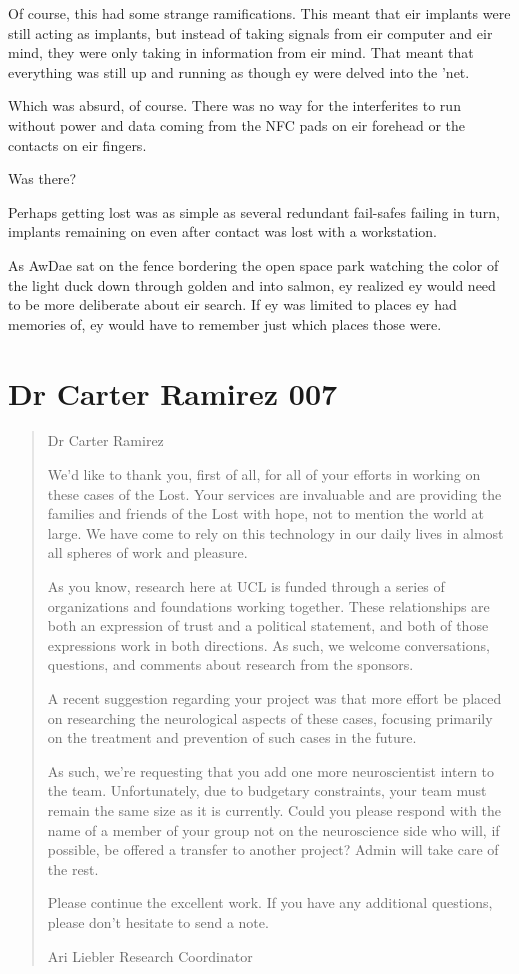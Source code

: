 Of course, this had some strange ramifications. This meant that eir implants were still acting as implants, but instead of taking signals from eir computer and eir mind, they were only taking in information from eir mind. That meant that everything was still up and running as though ey were delved into the 'net.

Which was absurd, of course. There was no way for the interferites to run without power and data coming from the NFC pads on eir forehead or the contacts on eir fingers.

Was there?

Perhaps getting lost was as simple as several redundant fail-safes failing in turn, implants remaining on even after contact was lost with a workstation.

As AwDae sat on the fence bordering the open space park watching the color of the light duck down through golden and into salmon, ey realized ey would need to be more deliberate about eir search. If ey was limited to places ey had memories of, ey would have to remember just which places those were.

\chapter*{Dr Carter Ramirez 007}

\begin{quote}
Dr Carter Ramirez

We'd like to thank you, first of all, for all of your efforts in working on these cases of the Lost. Your services are invaluable and are providing the families and friends of the Lost with hope, not to mention the world at large. We have come to rely on this technology in our daily lives in almost all spheres of work and pleasure.

As you know, research here at UCL is funded through a series of organizations and foundations working together. These relationships are both an expression of trust and a political statement, and both of those expressions work in both directions. As such, we welcome conversations, questions, and comments about research from the sponsors.

A recent suggestion regarding your project was that more effort be placed on researching the neurological aspects of these cases, focusing primarily on the treatment and prevention of such cases in the future.

As such, we're requesting that you add one more neuroscientist intern to the team. Unfortunately, due to budgetary constraints, your team must remain the same size as it is currently. Could you please respond with the name of a member of your group not on the neuroscience side who will, if possible, be offered a transfer to another project? Admin will take care of the rest.

Please continue the excellent work. If you have any additional questions, please don't hesitate to send a note.

Ari Liebler Research Coordinator
\end{quote}

